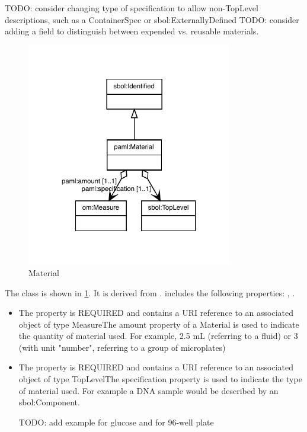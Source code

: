         TODO: consider changing type of specification to allow non-TopLevel descriptions, such as a ContainerSpec or sbol:ExternallyDefined
        TODO: consider adding a field to distinguish between expended vs. reusable materials.%
\linebreak%
\linebreak%


\begin{figure}[h!]%
\centering%
\includegraphics[width=0.8\textwidth]{paml_classes/Material_abstraction_hierarchy.pdf}%
\caption{Material}%
\label{fig:Material}%
\end{figure}

%
The  class is shown in \ref{fig:Material}. It is derived from .%
 includes the following properties: , . %
\begin{itemize}%
\item%
The  property is REQUIRED and contains a URI reference to an associated object of type MeasureThe amount property of a Material is used to indicate the quantity of material used.
        For example, 2.5 mL (referring to a fluid) or 3 (with unit "number", referring to a group of microplates)%
\item%
The  property is REQUIRED and contains a URI reference to an associated object of type TopLevelThe specification property is used to indicate the type of material used.
        For example a DNA sample would be described by an sbol:Component.

        TODO: add example for glucose and for 96-well plate%
\end{itemize}%

